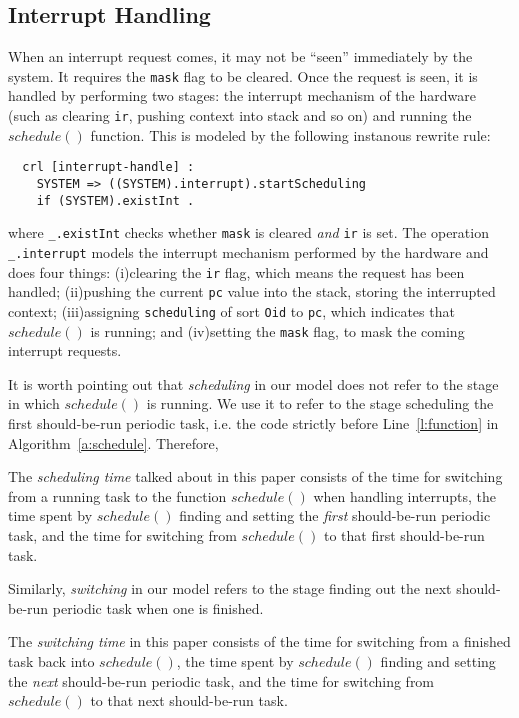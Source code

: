 \documentclass{llncs}
\begin{document}
\subsection{Interrupt Handling}
\label{ss:inthandling}
When an interrupt request comes, it may not be ``seen'' immediately by
the system. It requires the \verb|mask| flag to be cleared. Once the
request is seen, it is handled by performing two stages: the interrupt
mechanism of the hardware (such as clearing \verb|ir|, pushing context
into stack and so on) and running the $schedule()$ function. This is
modeled by the following instanous rewrite rule:
\begin{verbatim}
  crl [interrupt-handle] :
    SYSTEM => ((SYSTEM).interrupt).startScheduling
    if (SYSTEM).existInt .
\end{verbatim}
where \verb|_.existInt| checks whether \verb|mask| is cleared
\emph{and} \verb|ir| is set. The operation \verb|_.interrupt| models
the interrupt mechanism performed by the hardware and does four
things: (i)clearing the \verb|ir| flag, which means the request has
been handled; (ii)pushing the current \verb|pc| value into the stack,
storing the interrupted context; (iii)assigning \verb|scheduling| of
sort \verb|Oid| to \verb|pc|, which indicates that $schedule()$ is
running; and (iv)setting the \verb|mask| flag, to mask the coming
interrupt requests.

It is worth pointing out that \emph{scheduling} in our model does not
refer to the stage in which $schedule()$ is running. We use it to
refer to the stage scheduling the first should-be-run periodic task,
i.e.  the code strictly before Line~\ref{l:function} in
Algorithm~\ref{a:schedule}. Therefore,
\begin{definition}
  The \emph{scheduling time} talked about in this paper consists of
  the time for switching from a running task to the function
  $schedule()$ when handling interrupts, the time spent by
  $schedule()$ finding and setting the \emph{first} should-be-run
  periodic task, and the time for switching from $schedule()$ to that
  first should-be-run task.
\end{definition}
Similarly, \emph{switching} in our model refers to the stage finding
out the next should-be-run periodic task when one is finished.
\begin{definition}
  The \emph{switching time} in this paper consists of the time for
  switching from a finished task back into $schedule()$, the time
  spent by $schedule()$ finding and setting the \emph{next}
  should-be-run periodic task, and the time for switching from
  $schedule()$ to that next should-be-run task.
\end{definition}
\end{document}
